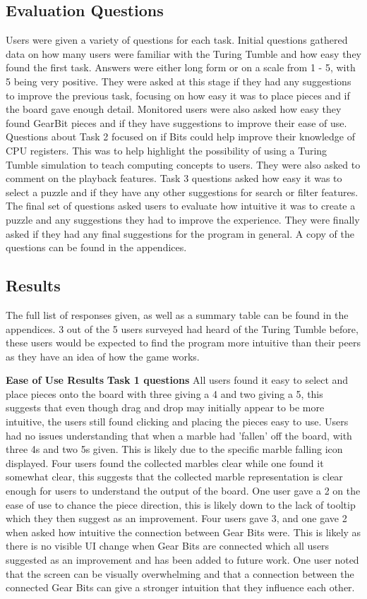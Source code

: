 \documentclass{l4proj}
\begin{document}
\subsection{Evaluation Questions}
Users were given a variety of questions for each task. Initial questions gathered data on how many users were familiar with the Turing Tumble and how easy they found the first task. Answers were either long form or on a scale from 1 - 5, with 5 being very positive. They were asked at this stage if they had any suggestions to improve the previous task, focusing on how easy it was to place pieces and if the board gave enough detail. Monitored users were also asked how easy they found GearBit pieces and if they have suggestions to improve their ease of use. Questions about Task 2 focused on if Bits could help improve their knowledge of CPU registers. This was to help highlight the possibility of using a Turing Tumble simulation to teach computing concepts to users. They were also asked to comment on the playback features. Task 3 questions asked how easy it was to select a puzzle and if they have any other suggestions for search or filter features. The final set of questions asked users to evaluate how intuitive it was to create a puzzle and any suggestions they had to improve the experience. They were finally asked if they had any final suggestions for the program in general. A copy of the questions can be found in the appendices.

\subsection{Results}
The full list of responses given, as well as a summary table can be found in the appendices. 3 out of the 5 users surveyed had heard of the Turing Tumble before, these users would be expected to find the program more intuitive than their peers as they have an idea of how the game works.

\textbf{Ease of Use Results}
\textbf{Task 1 questions}
All users found it easy to select and place pieces onto the board with three giving a 4 and two giving a 5, this suggests that even though drag and drop may initially appear to be more intuitive, the users still found clicking and placing the pieces easy to use. Users had no issues understanding that when a marble had 'fallen' off the board, with three 4s and two 5s given. This is likely due to the specific marble falling icon displayed. Four users found the collected marbles clear while one found it somewhat clear, this suggests that the collected marble representation is clear enough for users to understand the output of the board.  One user gave a 2 on the ease of use to chance the piece direction, this is likely down to the lack of tooltip which they then suggest as an improvement. Four users gave 3, and one gave 2 when asked how intuitive the connection between Gear Bits were. This is likely as there is no visible UI change when Gear Bits are connected which all users suggested as an improvement and has been added to future work. One user noted that the screen can be visually overwhelming and that a connection between the connected Gear Bits can give a stronger intuition that they influence each other. 
\end{document}
